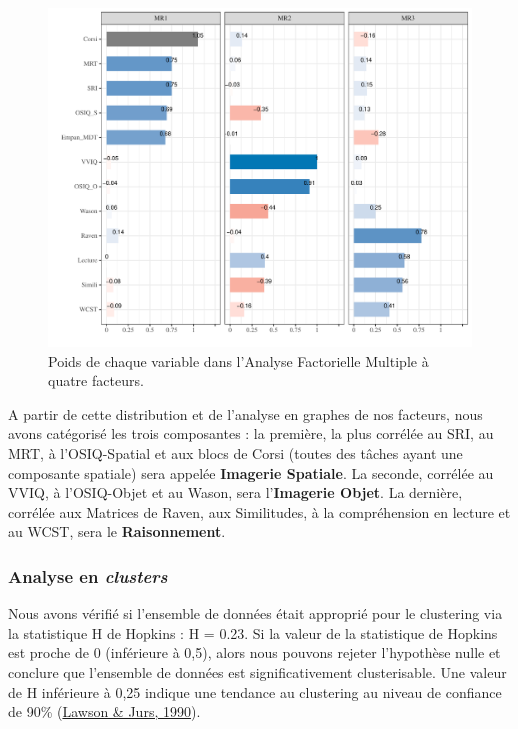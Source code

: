 \documentclass[
  12pt,
]{article}
\begin{document}
\begin{figure}[h]

\includegraphics[width=\textwidth,height=0.5\textheight]{aphantasia_quarto_files/figure-pdf/loadings_graph-1.pdf}

\caption{Poids de chaque variable dans l'Analyse Factorielle Multiple à quatre facteurs.}
\label{loadings_graph}
\end{figure}

A partir de cette distribution et de l'analyse en graphes de nos
facteurs, nous avons catégorisé les trois composantes : la première, la
plus corrélée au SRI, au MRT, à l'OSIQ-Spatial et aux blocs de Corsi
(toutes des tâches ayant une composante spatiale) sera appelée
\textbf{Imagerie Spatiale}. La seconde, corrélée au VVIQ, à l'OSIQ-Objet
et au Wason, sera l'\textbf{Imagerie Objet}. La dernière, corrélée aux
Matrices de Raven, aux Similitudes, à la compréhension en lecture et au
WCST, sera le \textbf{Raisonnement}.

\hypertarget{analyse-en-clusters}{%
\subsubsection{\texorpdfstring{Analyse en
\emph{clusters}}{Analyse en clusters}}\label{analyse-en-clusters}}

Nous avons vérifié si l'ensemble de données était approprié pour le
clustering via la statistique H de Hopkins : H = 0.23. Si la valeur de
la statistique de Hopkins est proche de 0 (inférieure à 0,5), alors nous
pouvons rejeter l'hypothèse nulle et conclure que l'ensemble de données
est significativement clusterisable. Une valeur de H inférieure à 0,25
indique une tendance au clustering au niveau de confiance de 90\%
(\protect\hyperlink{ref-lawsonNewIndexClustering1990}{Lawson \& Jurs,
1990}).
\end{document}
